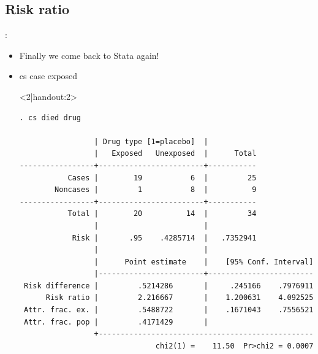 \subsection{Risk ratio}
\begin{frame}[fragile]{\secname: \subsecname}	
\begin{itemize}
\item Finally we come back to Stata again!
\item<2|handout:2> cs case exposed
\item[]<2|handout:2>\scriptsize \begin{verbatim}
. cs died drug

                 | Drug type [1=placebo]  |
                 |   Exposed   Unexposed  |      Total
-----------------+------------------------+-----------
           Cases |        19           6  |         25
        Noncases |         1           8  |          9
-----------------+------------------------+-----------
           Total |        20          14  |         34
                 |                        |
            Risk |       .95    .4285714  |   .7352941
                 |                        |
                 |      Point estimate    |    [95% Conf. Interval]
                 |------------------------+------------------------
 Risk difference |         .5214286       |     .245166    .7976911 
      Risk ratio |         2.216667       |    1.200631    4.092525 
 Attr. frac. ex. |         .5488722       |    .1671043    .7556521 
 Attr. frac. pop |         .4171429       |
                 +-------------------------------------------------
                               chi2(1) =    11.50  Pr>chi2 = 0.0007	
\end{verbatim}
\end{itemize}
\end{frame}

